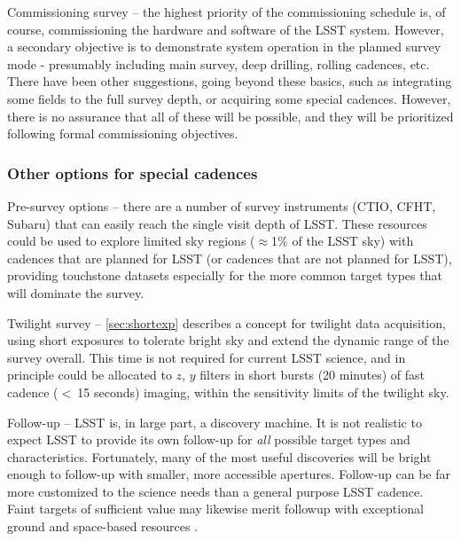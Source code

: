 \begin{description}
\item{Commissioning survey} -- the highest priority of the commissioning
schedule is, of course, commissioning the hardware and software of the LSST system.  However, a secondary objective
is to demonstrate system operation in the planned survey mode -
presumably including main survey, deep drilling, rolling cadences, etc.
There have been other suggestions, going beyond these basics, such as
integrating some fields to the full survey depth, or acquiring some
special cadences.  However, there is no assurance that all of these will
be possible, and they will be prioritized following formal commissioning
objectives.

\end{description}

\subsubsection{Other options for special cadences}

\begin{description}

\item{Pre-survey options} -- there are a number of survey instruments
(\eg CTIO, CFHT, Subaru) that can easily reach the single visit depth of
LSST. These resources could be used to explore limited sky regions
($\approx$1\% of the LSST sky) with cadences that are planned for LSST
(or cadences that are not planned for LSST), providing touchstone
datasets especially for the more common target types that will dominate
the survey.

\item{Twilight survey} -- \autoref{sec:shortexp} describes a concept for
twilight data acquisition, using short exposures to tolerate bright sky and extend the dynamic range of the survey overall.
This time is not required for current LSST science, and in principle
could be allocated to $z$, $y$ filters in short bursts (20 minutes) of
fast cadence ($<~$15 seconds) imaging, within the sensitivity limits of
the twilight sky.

\item{Follow-up} -- LSST is, in large part, a discovery machine. It is
not realistic to expect LSST to provide its own follow-up for {\it all}
possible target types and characteristics. Fortunately, many of the most
useful discoveries will be bright enough to follow-up with smaller, more
accessible apertures.  Follow-up can be far more customized to the
science needs than a general purpose LSST cadence.  Faint targets of
sufficient value may likewise merit followup with exceptional  ground
and space-based resources  \citep[see][for analysis and discussion]{NajitaEtal2016}.

\end{description}


